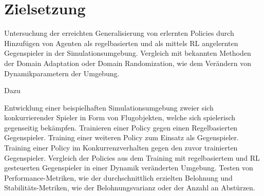 \section{Zielsetzung}

Untersuchung der erreichten Generalisierung von erlernten Policies durch Hinzufügen von Agenten als regelbasierten und als mittels RL angelernten Gegenspieler in der Simulationsumgebung. Vergleich mit bekannten Methoden der Domain Adaptation oder Domain Randomization, wie dem Verändern von Dynamikparametern der Umgebung.

Dazu 

Entwicklung einer beispielhaften Simulationsumgebung zweier sich konkurrierender Spieler in Form von Flugobjekten, welche sich spielerisch gegenseitig bekämpfen. Trainieren einer Policy gegen einen Regelbasierten Gegenspieler. 
Training einer weiteren Policy zum Einsatz als Gegenspieler. 
Training einer Policy im Konkurrenzverhalten gegen den zuvor trainierten Gegenspieler.  
Vergleich der Policies aus dem Training mit regelbasiertem und RL gesteuerten Gegenspieler in einer Dynamik veränderten Umgebung.
Testen von Performance-Metriken, wie der durchschnittlich erzielten Belohnung und Stabilitäts-Metriken, wie der Belohnungsvarianz oder der Anzahl an Abstürzen.
